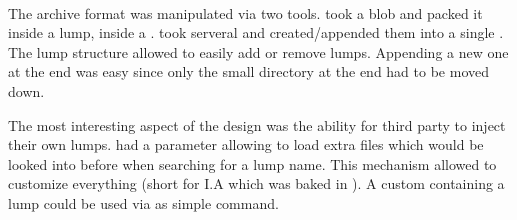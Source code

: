 \par
{}
\par
{}\\
\par
{}
\par
The archive format was manipulated via two tools.  took a blob and packed it inside a lump, inside a .  took serveral  and created/appended them into a single . The lump structure allowed to easily add or remove lumps. Appending a new one at the end was easy since only the small directory at the end had to be moved down.\\
\par
The most interesting aspect of the design was the ability for third party to inject their own lumps. \doom had a parameter allowing to load extra  files which would be looked into before  when searching for a lump name. This mechanism allowed to customize everything (short for I.A which was baked in ). A custom  containing a  lump could be used via as simple  command.




